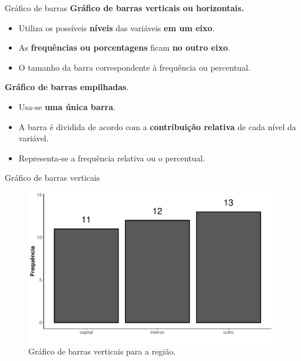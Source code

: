 \documentclass[
  ignorenonframetext,
  serif,
  professionalfont,
  usenames,
  dvipsnames,
  aspectratio = 169]{beamer}
\providecommand{\tightlist}{%
  \setlength{\itemsep}{0pt}\setlength{\parskip}{0pt}}
\renewcommand{\tightlist}{%
  \setlength{\itemsep}{0\baselineskip}
  \setlength{\parskip}{0.25\baselineskip}
}
\begin{document}
\begin{frame}{Gráfico de barras}
\label{gruxe1fico-de-barras}
\textbf{Gráfico de barras verticais ou horizontais.}

\begin{itemize}
\tightlist
\item
  Utiliza os possíveis \textbf{níveis} das variáveis
  \textbf{em um eixo}.
\item
  As \textbf{frequências ou porcentagens} ficam \textbf{no outro eixo}.
\item
  O tamanho da barra correspondente à frequência ou percentual.
\end{itemize}

\vspace{0.5cm}

\textbf{Gráfico de barras empilhadas}.

\begin{itemize}
\tightlist
\item
  Usa-se \textbf{uma única barra}.
\item
  A barra é dividida de acordo com a \textbf{contribuição relativa} de
  cada nível da variável.
\item
  Representa-se a frequência relativa ou o percentual.
\end{itemize}
\end{frame}

\begin{frame}{Gráfico de barras verticais}
\label{gruxe1fico-de-barras-verticais}
\begin{figure}

{\centering \includegraphics[width=11cm]{encontro1_files/figure-beamer/unnamed-chunk-40-1} 

}

\caption{Gráfico de barras verticais para a região.}\label{fig:unnamed-chunk-40}
\end{figure}
\end{frame}
\end{document}
